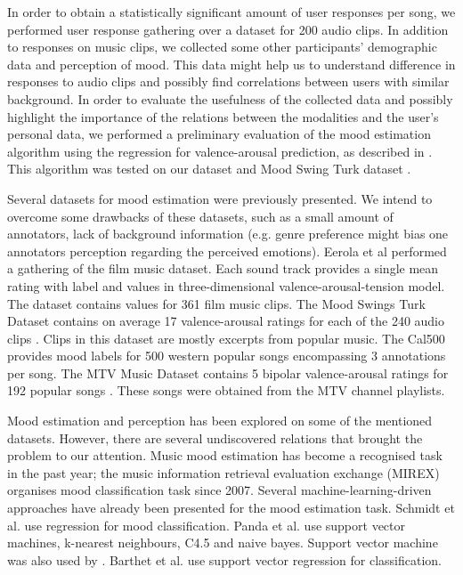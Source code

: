 \documentclass[a4paper]{article}
\begin{document}
In order to obtain a statistically significant amount of user responses per song, we performed user response gathering over a dataset for 200 audio clips. In addition to responses on music clips, we collected some other participants' demographic data and perception of mood. This data might help us to understand difference in responses to audio clips and possibly find correlations between users with similar background. In order to evaluate the usefulness of the collected data and possibly highlight the importance of the relations between the modalities and the user's personal data, we performed a preliminary evaluation of the mood estimation algorithm using the regression for valence-arousal prediction, as described in \cite{schmidt2009projection}. This algorithm was tested on our dataset and Mood Swing Turk dataset \cite{schmidt2011modeling}.

Several datasets for mood estimation were previously presented. We intend to overcome some drawbacks of these datasets, such as a small amount of annotators, lack of background information (e.g. genre preference might bias one annotators perception regarding the perceived emotions). Eerola et al \cite{eerola2010comparison} performed a gathering of the film music dataset. Each sound track provides a single mean rating with label and values in three-dimensional valence-arousal-tension model. The dataset contains values for 361 film music clips. The Mood Swings Turk Dataset contains on average 17 valence-arousal ratings for each of the 240 audio clips \cite{schmidt2011modeling}. Clips in this dataset are mostly excerpts from popular music. The Cal500 provides mood labels for 500 western popular songs \cite{turnbull2008semantic} encompassing 3 annotations per song. The MTV Music Dataset contains 5 bipolar valence-arousal ratings for 192 popular songs \cite{schuller2010mister}. These songs were obtained from the MTV channel playlists.


Mood estimation and perception has been explored on some of the mentioned datasets. However, there are several undiscovered relations that brought the problem to our attention. Music mood estimation has become a recognised task in the past year; the music information retrieval evaluation exchange (MIREX) organises mood classification task since 2007. Several machine-learning-driven approaches have already been presented for the mood estimation task. Schmi\-dt et al. \cite{schmidt2009projection} use regression for mood classification. Panda et al. \cite{panda2013multi} use support vector machines, k-nearest neighbours, C4.5 and naive bayes. Support vector machine was also used by \cite{laurier2007audio}. Barthet et al. \cite{barthet2013design} use support vector regression for classification. 
\end{document}
